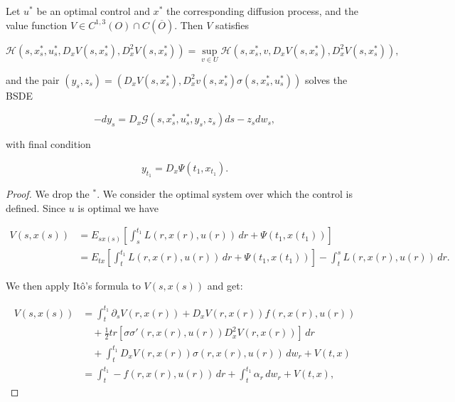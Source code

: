 \begin{theorem}\label{2-3-stochmaxprinc}
    Let $u^{\ast}$ be an optimal control and $x^{\ast}$ the corresponding diffusion process, and the value function 
    $V\in C^{1,3}(O)\cap C(\overline{O})$. Then $V$ satisfies
    
    \begin{equation}\label{2-3-maxcond}
        \mathcal{H}(s,x_s^{\ast}, u_s^{\ast}, D_xV(s,x^{\ast}_s), D_x^2V(s,x^{\ast}_s)) = \sup_{v \in U}\mathcal{H}(s,x_s^{\ast}, v, D_xV(s,x^{\ast}_s), D_x^2V(s,x^{\ast}_s)),
    \end{equation}

    and the pair $(y_s,z_s)=\left(D_xV(s,x_s^{\ast}),D_x^2v(s,x_s^{\ast})\sigma(s,x_s^{\ast},u_s^{\ast})\right)$ solves the BSDE

    \begin{equation}\label{2-3-maxprinc-BSDE}
        -dy_s = D_x\mathcal{G}(s,x_s^{\ast}, u_s^{\ast}, y_s, z_s)ds - z_sdw_s,
    \end{equation}

    with final condition

    \begin{equation}\label{2-3-maxprinc-finalcond}
        y_{t_1} = D_x\Psi(t_1,x_{t_1}).
    \end{equation}

    \begin{proof}
        We drop the $^{\ast}$. We consider the optimal system over which the control is defined. 
        Since $u$ is optimal we have

        \begin{align*}
            V(s,x(s)) & = E_{sx(s)}\left[\int_s^{t_1} L(r,x(r),u(r))\,dr + \Psi(t_1,x(t_1))\right] \\ 
            & = E_{tx}\left[\int_t^{t_1} L(r,x(r),u(r))\,dr + \Psi(t_1,x(t_1))\right] - \int_t^s L(r,x(r),u(r))\,dr.  
        \end{align*}

        We then apply It\^o's formula to $V(s,x(s))$ and get:

        \begin{equation}\label{Ito to V BSDE}
            \begin{aligned}
                V(s,x(s)) & = \int_t^{t_1} \partial_sV(r,x(r)) + D_xV(r,x(r))f(r,x(r),u(r)) \\
                & \quad + \frac{1}{2}tr\left[\sigma\sigma'(r,x(r),u(r))D_x^2V(r,x(r))\right] \,dr \\
                & \quad + \int_t^{t_1} D_xV(r,x(r))\sigma(r,x(r),u(r))\,dw_r + V(t,x) \\
                & = \int_t^{t_1} - f(r,x(r),u(r))\,dr + \int_t^{t_1}\alpha_r\,dw_r + V(t,x),
            \end{aligned}
        \end{equation}


\end{proof}
\end{theorem}
